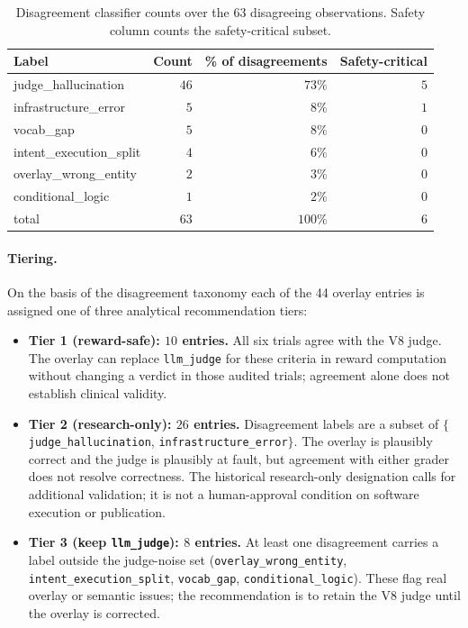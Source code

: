 \begin{table}[h]
\centering
\caption{Disagreement classifier counts over the $63$
disagreeing observations. Safety column counts the
safety-critical subset.}
\label{tab:v9_labels}
\small
\begin{tabular}{lrrr}
\toprule
Label & Count & \% of disagreements & Safety-critical \\
\midrule
judge\_hallucination       & $46$ & $73\%$ & $5$ \\
infrastructure\_error      & $5$  %
                                   & $8\%$  & $1$ \\
vocab\_gap                 & $5$  & $8\%$  & $0$ \\
intent\_execution\_split   & $4$  & $6\%$  & $0$ \\
overlay\_wrong\_entity     & $2$  & $3\%$  & $0$ \\
conditional\_logic         & $1$  & $2\%$  & $0$ \\
\midrule
total                      & $63$ & $100\%$ & $6$ \\
\bottomrule
\end{tabular}
\end{table}

\paragraph{Tiering.}
On the basis of the disagreement taxonomy each of the 44
overlay entries is assigned one of three analytical recommendation tiers:

\begin{itemize}
  \item \textbf{Tier 1 (reward-safe): $10$ entries.} %
  All six trials agree with the V8 judge. The overlay can
  replace \texttt{llm\_judge} for these criteria in reward
  computation without changing a verdict in those audited trials;
  agreement alone does not establish clinical validity.
  \item \textbf{Tier 2 (research-only): $26$ entries.} %
  Disagreement labels are a subset of $\{$\texttt{judge\_hallucination},
  \texttt{infrastructure\_error}$\}$. The overlay is
  plausibly correct and the judge is plausibly at fault,
  but agreement with either grader does not resolve correctness. The
  historical research-only designation calls for additional validation;
  it is not a human-approval condition on software execution or publication.
  \item \textbf{Tier 3 (keep \texttt{llm\_judge}):
  $8$ entries.} %
  At least one disagreement carries a label outside the
  judge-noise set (\texttt{overlay\_wrong\_entity},
  \texttt{intent\_execution\_split}, \texttt{vocab\_gap},
  \texttt{conditional\_logic}). These flag real overlay or
  semantic issues; the recommendation is to retain the V8 judge until
  the overlay is corrected.
\end{itemize}

